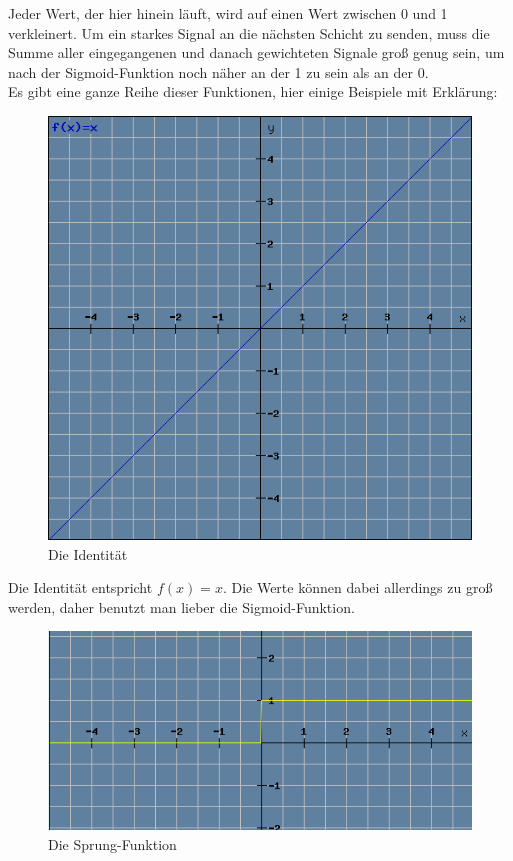 \documentclass[12pt]{article}
\begin{document}
Jeder Wert, der hier hinein läuft, wird auf einen Wert zwischen 0 und 1 verkleinert. 
Um ein starkes Signal an die nächsten Schicht zu senden, muss die Summe aller eingegangenen und danach gewichteten Signale groß genug sein, um nach der Sigmoid-Funktion noch näher an der 1 zu sein als an der 0. 
\\Es gibt eine ganze Reihe dieser Funktionen, hier einige Beispiele mit Erklärung:
\begin{figure}[H]
\centering
\includegraphics[scale=0.5]{./Images/Pasted image 20230912194736.png}
\caption{Die Identität}
\label{Die Identität}
\end{figure}
Die Identität entspricht $f(x) = x$. Die Werte können dabei allerdings zu groß werden, daher benutzt man lieber die Sigmoid-Funktion. 
\begin{figure}[H]
\centering
\includegraphics[scale=0.60]{./Images/Pasted image 20230912195705.png}
\caption{Die Sprung-Funktion}
\label{Die Sprung-Funktion}
\end{figure}
\end{document}
